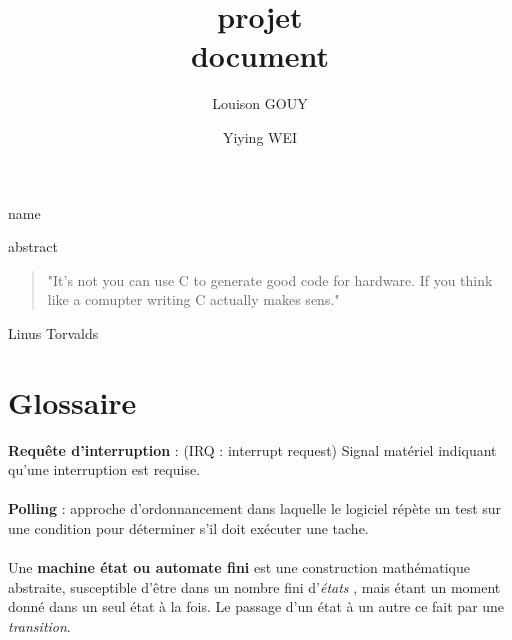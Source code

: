 \documentclass[a4paper]{article}
\title{\textbf{projet} \\ document}
\author{Louison GOUY \and Yiying WEI}
\begin{document}
\maketitle

\vspace{2cm}

\begin{center}
\end{center}

\vspace*{1cm}

\begin{center}
    name
\end{center}

\vspace*{7cm}

\begin{center}

abstract
\end{center}

\newpage
\vspace*{3cm}
\begin{quotation}
	"It's not you can use C to generate good code for hardware. If you think like a comupter writing C actually makes sens."
\end{quotation}
\begin{flushright}
	Linus Torvalds
\end{flushright} 
\newpage


\newpage
\renewcommand{\contentsname}{Table des Matières}
\tableofcontents
\newpage
\renewcommand\listfigurename{Liste des figures}
\listoffigures
\newpage

\section{Glossaire}

\textbf{Requête d'interruption} : (IRQ : interrupt request) Signal matériel indiquant qu'une interruption est requise. \\ ~ \\

\textbf{Polling} : approche d'ordonnancement dans laquelle le logiciel répète un test sur une condition pour déterminer s'il doit exécuter une tache.\cite{ARM_book} \\ ~ \\

Une\textbf{ machine état ou automate fini} est une construction mathématique abstraite, susceptible d'être dans un nombre fini d'\textit{états} , mais étant un moment donné dans un seul état à la fois. Le passage d'un état à un autre ce fait par une \textit{transition}. 
\end{document}
